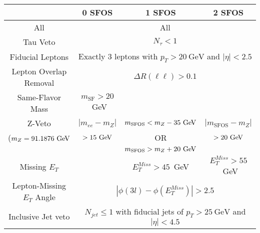 \begin{tabular}{|c||c||c||c|}
\hline
&  0 SFOS  	& 1 SFOS		  & 2 SFOS  \\
\hline 
\hline 
All & \multicolumn{3}{c|}{All} \\
\hline 
Tau Veto & \multicolumn{3}{c|}{$N_{\tau} < 1$} \\
\hline 
Fiducial Leptons & \multicolumn{3}{c|}{Exactly 3 leptons with $p_{T} > 20~\mathrm{GeV}$ and $|\eta|<2.5$} \\
\hline 
Lepton Overlap Removal & \multicolumn{3}{c|}{$\Delta R(\ell \ell) > 0.1$}\\
\hline 
Same-Flavor Mass &	$m_{\textrm{SF}} > 20$~GeV	& \multicolumn{2}{c|}{} \\
\hline 
Z-Veto                &  $|m_{ee}-m_Z|$ & $m_{\textrm{SFOS}} < m_{Z}-35\GeV$ & $|m_{\textrm{SFOS}}-m_Z|$ \\
($m_Z = 91.1876\GeV$  &  $>15\GeV$                                         & OR   &  $>20\GeV$\\
                      & 					  & $m_{\textrm{SFOS}}>m_{Z}+20\GeV$	   &  \\
\hline 
Missing $E_{T}$		& 		& $E_{T}^{Miss} > 45$~GeV & $E_{T}^{Miss} > 55$~GeV \\
\hline 
Lepton-Missing $E_{T}$ Angle 	& 	\multicolumn{3}{c|}{$|\phi(3l)-\phi(E_{T}^{Miss})| > 2.5$} \\
\hline 
Inclusive Jet veto	& \multicolumn{3}{c|}{$N_{jet} \leq 1$ with fiducial jets of $p_{T} > 25~\mathrm{GeV}$ and $|\eta| < 4.5$ } \\
\hline 
\end{tabular}
